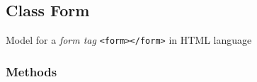 \subsection{Class Form}

    \label{module_Web:Form}

Model for a \emph{form tag} \texttt{<form></form>} in HTML language


  \subsubsection{Methods}

    \label{module_Web:Form:__init__}

    \vspace{0.5ex}

